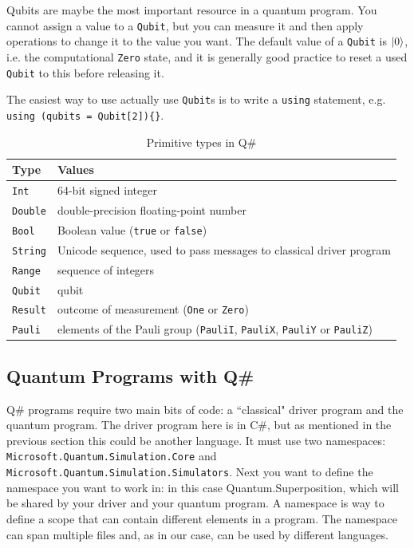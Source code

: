 Qubits are maybe the most important resource in a quantum program. You cannot assign a value to a \texttt{Qubit}, but you can measure it and then apply operations to change it to the value you want. The default value of a \texttt{Qubit} is $\left\vert{0}\right\rangle$, i.e. the computational \texttt{Zero} state, and it is generally good practice to reset a used \texttt{Qubit} to this before releasing it.

The easiest way to use actually use \texttt{Qubit}s is to write a \texttt{using} statement, e.g. \texttt{using (qubits = Qubit[2])\{<any code using these qubits>\}}.

\begin{table}[!htb]
      \centering
        \begin{tabular}{|l|l|}
        \hline
        Type    & Values \\ 
        \hline
        \texttt{Int}     & 64-bit signed integer \\
        \texttt{Double}  & double-precision floating-point number \\
        \texttt{Bool}    & Boolean value (\texttt{true} or \texttt{false}) \\
        \texttt{String}  & Unicode sequence, used to pass messages to classical driver program\\
        \texttt{Range}   & sequence of integers\\
        \texttt{Qubit}   & qubit\\
        \texttt{Result}  & outcome of measurement (\texttt{One} or \texttt{Zero})\\
        \texttt{Pauli}   & elements of the Pauli group (\texttt{PauliI}, \texttt{PauliX}, \texttt{PauliY} or \texttt{PauliZ})\\
        \hline
    \end{tabular}
    \caption{Primitive types in Q\#}
    \label{table:PrimTypeQsharp}
\end{table}

\subsection{Quantum Programs with Q\#}
Q\# programs require two main bits of code: a ``classical" driver program and the quantum program. The driver program here is in C\#, but as mentioned in the previous section this could be another language. It must use two namespaces: \texttt{Microsoft.Quantum.Simulation.Core} and \\ \texttt{Microsoft.Quantum.Simulation.Simulators}. Next you want to define the namespace you want to work in: in this case Quantum.Superposition, which will be shared by your driver and your quantum program. A namespace is way to define a scope that can contain different elements in a program. The namespace can span multiple files and, as in our case, can be used by different languages.


